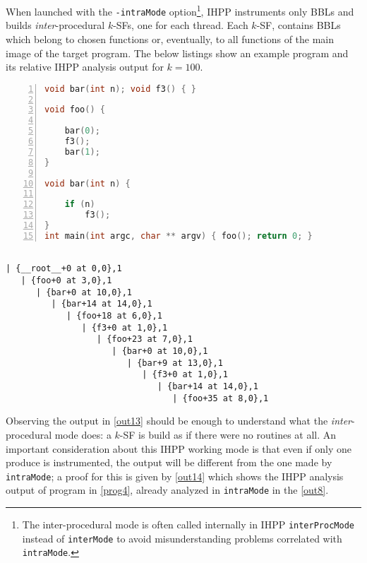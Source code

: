 \documentclass[a4paper,10pt]{report}
\begin{document}
When launched with the \verb|-intraMode| option\footnote{The inter-procedural mode is often called internally in IHPP \texttt{interProcMode} instead of \texttt{interMode} to
avoid misunderstanding problems correlated with \texttt{intraMode}.},
IHPP instruments only BBLs and builds \emph{inter}-procedural $k$-SFs, one for each thread.
Each $k$-SF, contains BBLs which belong to chosen functions or, eventually, to all
functions of the main image of the target program. The below listings show
an example program and its relative IHPP analysis output for $k=100$.

\begin{lstlisting}[language=C,
	caption={prog6.c, an example program}, label=prog6, frame=leftline, numbers=left]
void bar(int n); void f3() { }

void foo() {

	bar(0);
	f3();
	bar(1);
}

void bar(int n) {

	if (n)
		f3();
}
int main(int argc, char ** argv) { foo(); return 0; }
\end{lstlisting}

\begin{lstlisting}[label=out13, frame=bottomline,
caption={partial output of IHPP analysis in \texttt{interProcMode} of \texttt{prog6}}]

| {__root__+0 at 0,0},1
   | {foo+0 at 3,0},1
      | {bar+0 at 10,0},1
         | {bar+14 at 14,0},1
            | {foo+18 at 6,0},1
               | {f3+0 at 1,0},1
                  | {foo+23 at 7,0},1
                     | {bar+0 at 10,0},1
                        | {bar+9 at 13,0},1
                           | {f3+0 at 1,0},1
                              | {bar+14 at 14,0},1
                                 | {foo+35 at 8,0},1

\end{lstlisting}

Observing the output in \cref{out13} should be enough to understand what the
\emph{inter}-procedural mode does: a $k$-SF is build as if there were no routines at all.
An important consideration about this IHPP working mode is that even if
only one produce is instrumented, the output will be different from the one made by
\verb|intraMode|; a proof for this is given by \cref{out14} which shows
the IHPP analysis output of program in \cref{prog4},
already analyzed in \verb|intraMode| in the \cref{out8}.
\end{document}

